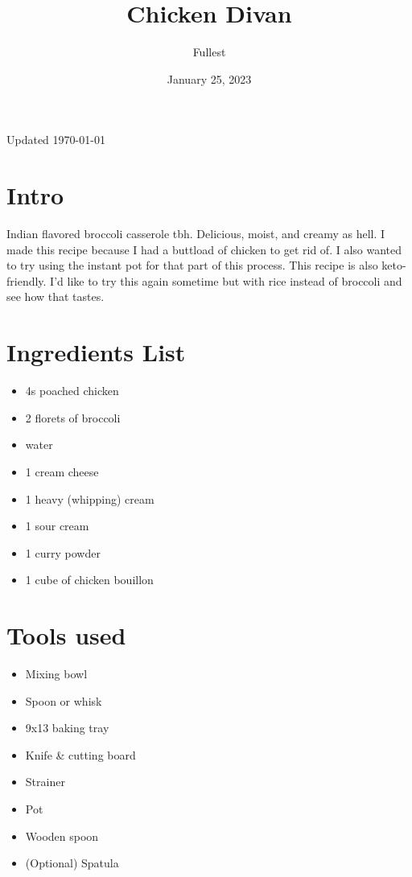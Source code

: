 \documentclass{article}
\title{\textbf{Chicken Divan}}
\author{Fullest}
\date{January 25, 2023}
\let\US\SI
\begin{document}
\maketitle
\thispagestyle{empty}

\begin{multicols}{2}


Updated \today
\section{Intro}
\cite{WEBSITEWITHRECIPE:1}Indian flavored broccoli casserole tbh. Delicious, moist, and creamy as hell. I made this recipe because I had a buttload of chicken to get rid of. I also wanted to try using the instant pot\cite{CHICKEN} for that part of this process. This recipe is also keto-friendly. I'd like to try this again sometime but with rice instead of broccoli and see how that tastes.

\section{Ingredients List}
\begin{itemize}
	\item \US{4}{\cup}s poached chicken\cite{CHICKEN}
	\item 2 florets of broccoli
	\item water
	\item \US{1}{\cup} cream cheese
	\item \US{1}{\cup} heavy (whipping) cream
	\item \US{1}{\cup} sour cream
	\item \US{1}{\tbsp} curry powder\cite{CURRYPOWDER}
	\item 1 cube of chicken bouillon
\end{itemize}

\section{Tools used}
\begin{itemize}
	\item Mixing bowl
	\item Spoon or whisk
	\item 9x13 baking tray
	\item Knife \& cutting board
	\item Strainer
	\item Pot
	\item Wooden spoon
	\item (Optional) Spatula\\\\ %
\end{itemize}


\end{multicols}
\end{document}
